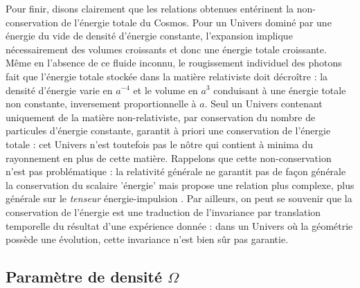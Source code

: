 Pour finir, disons clairement que les relations obtenues entérinent la non-conservation de l'énergie totale du Cosmos. Pour un Univers dominé par une énergie du vide de densité d'énergie constante, l'expansion implique nécessairement des volumes croissants et donc une énergie totale croissante.  Même en l'absence de ce fluide inconnu, le rougissement individuel des photons fait que l'énergie totale stockée dans la matière relativiste doit décroître : la densité d'énergie varie en $a^{-4}$ et le volume en $a^3$ conduisant à une énergie totale non constante, inversement proportionnelle à $a$. Seul un Univers contenant uniquement de la matière non-relativiste, par conservation du nombre de particules d'énergie constante, garantit à priori une conservation de l'énergie totale : cet Univers n'est toutefois pas le nôtre qui contient à minima du rayonnement en plus de cette matière. Rappelons que cette non-conservation n'est pas problématique : la relativité générale ne garantit pas de façon générale la conservation du scalaire 'énergie' mais propose une relation plus complexe, plus générale sur le \textit{tenseur} énergie-impulsion . Par ailleurs, on peut se souvenir que la conservation de l'énergie est une traduction de l'invariance par translation temporelle du résultat d'une expérience donnée : dans un Univers où la géométrie possède une évolution, cette invariance n'est bien sûr pas garantie.

\subsection{Paramètre de densité $\Omega$}

